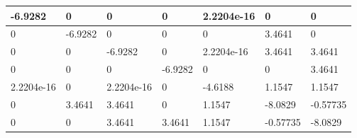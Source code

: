 \begin{tabular}{|l|l|l|l|l|l|l|}
\hline
-6.9282&0&0&0&2.2204e-16&0&0\\\hline
0&-6.9282&0&0&0&3.4641&0\\\hline
0&0&-6.9282&0&2.2204e-16&3.4641&3.4641\\\hline
0&0&0&-6.9282&0&0&3.4641\\\hline
2.2204e-16&0&2.2204e-16&0&-4.6188&1.1547&1.1547\\\hline
0&3.4641&3.4641&0&1.1547&-8.0829&-0.57735\\\hline
0&0&3.4641&3.4641&1.1547&-0.57735&-8.0829\\\hline
\end{tabular}
